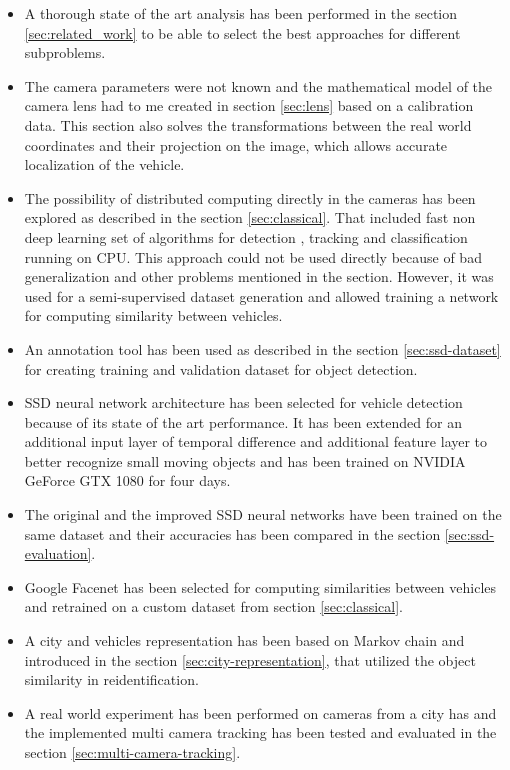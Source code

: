 \documentclass[a4paper,12pt,titlepage, twoside]{article}
\numberwithin{figure}{section}
\begin{document}
\begin{itemize}

\item A thorough state of the art analysis has been performed in the section \ref{sec:related_work} to be able to select the best approaches for different subproblems. 

\item The camera parameters were not known and the mathematical model of the camera lens had to me created in section \ref{sec:lens} based on a calibration data. This section also solves the transformations between the real world coordinates and their projection on the image, which allows accurate localization of the vehicle.

\item The possibility of distributed computing directly in the cameras has been explored as described in the section \ref{sec:classical}. That included fast non deep learning set of algorithms for detection \cite{piccardi2004background}, tracking \cite{optical-flow} and classification \cite{haar} running on CPU. This approach could not be used directly because of bad generalization and other problems mentioned in the section. However, it was used for a semi-supervised dataset generation and allowed training a network for computing similarity between vehicles.

\item An annotation tool has been used as described in the section \ref{sec:ssd-dataset} for creating training and validation dataset for object detection.

\item SSD \cite{liu2016ssd} neural network architecture has been selected for vehicle detection because of its state of the art performance. It has been extended for an additional input layer of temporal difference and additional feature layer to better recognize small moving objects and has been trained on NVIDIA GeForce GTX 1080 for four days.

\item The original and the improved SSD neural networks have been trained on the same dataset and their accuracies has been compared in the section \ref{sec:ssd-evaluation}. 

\item Google Facenet \cite{schroff2015facenet} has been selected for computing similarities between vehicles and retrained on a custom dataset from section \ref{sec:classical}.

\item A city and vehicles representation has been based on Markov chain and introduced in the section \ref{sec:city-representation}, that utilized the object similarity in reidentification.

\item A real world experiment has been performed on cameras from a city has and the implemented multi camera tracking has been tested and evaluated in the section \ref{sec:multi-camera-tracking}.

\end{itemize}
\end{document}
